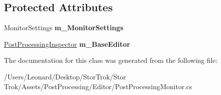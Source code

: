 \subsection*{Protected Attributes}
\begin{DoxyCompactItemize}
\item 
\mbox{\label{class_unity_editor_1_1_post_processing_1_1_post_processing_monitor_aafb8128cac56dbe0e784e1f55f8525a9}} 
Monitor\+Settings {\bfseries m\+\_\+\+Monitor\+Settings}
\item 
\mbox{\label{class_unity_editor_1_1_post_processing_1_1_post_processing_monitor_a2553b93b6efa7231ed205cc06d6495f8}} 
\hyperlink{class_unity_editor_1_1_post_processing_1_1_post_processing_inspector}{Post\+Processing\+Inspector} {\bfseries m\+\_\+\+Base\+Editor}
\end{DoxyCompactItemize}


The documentation for this class was generated from the following file\+:\begin{DoxyCompactItemize}
\item 
/\+Users/\+Leonard/\+Desktop/\+Stor\+Trok/\+Stor Trok/\+Assets/\+Post\+Processing/\+Editor/Post\+Processing\+Monitor.\+cs\end{DoxyCompactItemize}
